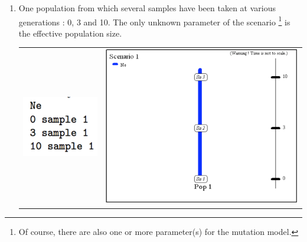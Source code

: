 \begin{enumerate}
\item One population from which several samples have been taken at various
generations : 0, 3 and 10. The only unknown parameter of the scenario%
\footnote{Of course, there are also one or more parameter(s) for the mutation
model.%
} is the effective population size. \\



\begin{center}
\begin{tabular}{cc}
\includegraphics[scale=0.5]{code_scenario_01}  & \includegraphics[scale=0.35]{scenario_01} \tabularnewline
\end{tabular}
\par\end{center}


\end{enumerate}
